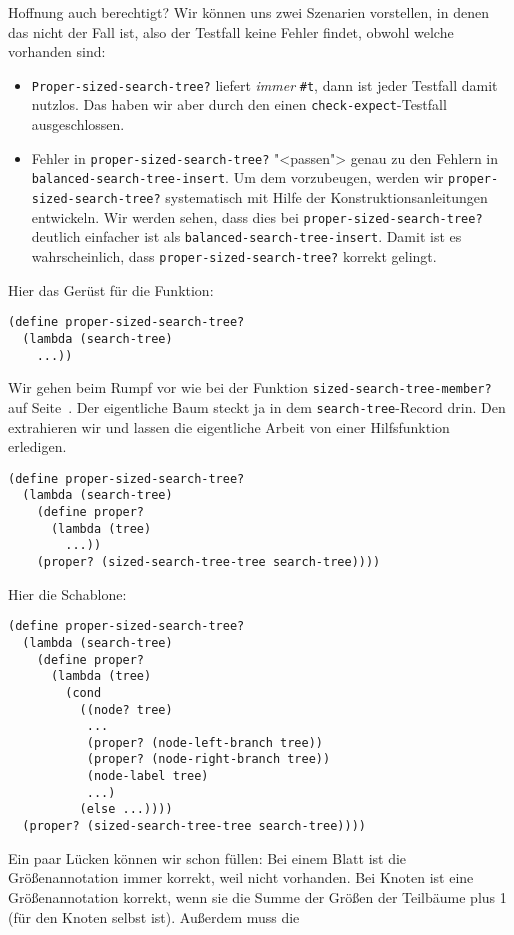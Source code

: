 Hoffnung auch berechtigt?  Wir können uns zwei Szenarien vorstellen,
in denen das nicht der Fall ist, also der Testfall keine Fehler
findet, obwohl welche vorhanden sind:
%
\begin{itemize}
\item \lstinline{Proper-sized-search-tree?} liefert \emph{immer}
  \lstinline{#t}, dann ist jeder Testfall damit nutzlos.  Das haben
  wir aber durch den einen \lstinline{check-expect}-Testfall
  ausgeschlossen.
\item Fehler in \lstinline{proper-sized-search-tree?} "<passen"> genau
  zu den Fehlern in \lstinline{balanced-search-tree-insert}.  Um dem
  vorzubeugen, werden wir \lstinline{proper-sized-search-tree?}
  systematisch mit Hilfe der Konstruktionsanleitungen entwickeln.
  Wir werden sehen, dass dies bei
  \lstinline{proper-sized-search-tree?} deutlich einfacher ist als
  \lstinline{balanced-search-tree-insert}.  
  Damit ist es wahrscheinlich, dass
  \lstinline{proper-sized-search-tree?} korrekt gelingt.
\end{itemize}
%
Hier das Gerüst für die Funktion:
%
\begin{lstlisting}
(define proper-sized-search-tree?
  (lambda (search-tree)
    ...))
\end{lstlisting}
%
Wir gehen beim Rumpf vor wie bei der Funktion
\lstinline{sized-search-tree-member?} auf
Seite~\pageref{func:sized-search-tree-member}. Der eigentliche Baum
steckt ja in dem \lstinline{search-tree}-Record drin.  Den extrahieren
wir und lassen die eigentliche Arbeit von einer Hilfsfunktion erledigen.
%
\begin{lstlisting}
(define proper-sized-search-tree?
  (lambda (search-tree)
    (define proper?
      (lambda (tree)
        ...))
    (proper? (sized-search-tree-tree search-tree))))
\end{lstlisting}
%
Hier die Schablone:
%
\begin{lstlisting}
(define proper-sized-search-tree?
  (lambda (search-tree)
    (define proper?
      (lambda (tree)
        (cond
          ((node? tree)
           ...
           (proper? (node-left-branch tree))
           (proper? (node-right-branch tree))
           (node-label tree)
           ...)
          (else ...))))
  (proper? (sized-search-tree-tree search-tree))))
\end{lstlisting}
%
Ein paar Lücken können wir schon füllen: Bei einem Blatt ist die
Größenannotation immer korrekt, weil nicht vorhanden.  Bei Knoten ist
eine Größenannotation korrekt, wenn sie die Summe der Größen der
Teilbäume plus 1 (für den Knoten selbst ist).  Außerdem muss die
